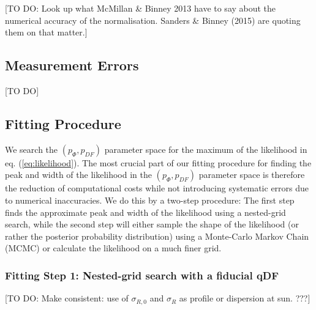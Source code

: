 \documentclass[12pt,preprint]{aastex}
\begin{document}
[TO DO: Look up what McMillan \& Binney 2013 have to say about the numerical accuracy of the normalisation. Sanders \& Binney (2015) are quoting them on that matter.]

\subsection{Measurement Errors}

[TO DO]

\subsection{Fitting Procedure}

We search the $(p_\Phi,p_{DF})$ parameter space for the maximum of the likelihood in eq. (\ref{eq:likelihood}). The most crucial part of our fitting procedure for finding the peak and width of the likelihood in the $(p_\Phi,p_{DF})$ parameter space  is therefore the reduction of computational costs while not introducing systematic errors due to numerical inaccuracies. We do this by a two-step procedure: The first step finds the approximate peak and width of the likelihood using a nested-grid search, while the second step will either sample the shape of the likelihood (or rather the posterior probability distribution) using a Monte-Carlo Markov Chain (MCMC) or calculate the likelihood on a much finer grid.

\subsubsection{Fitting Step 1: Nested-grid search with a fiducial qDF}

[TO DO: Make consistent: use of $\sigma_{R,0}$ and $\sigma_R$ as profile or dispersion at sun. ???]
\end{document}

